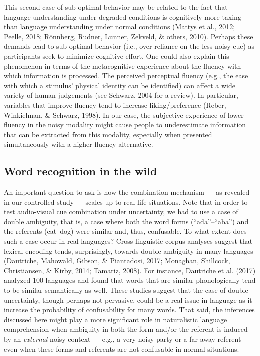 \documentclass[english,,man,floatsintext]{apa6}
\theoremstyle{definition}
\theoremstyle{definition}
\theoremstyle{definition}
\theoremstyle{remark}
\begin{document}
This second case of sub-optimal behavior may be related to the fact that
language understanding under degraded conditions is cognitively more
taxing than language understanding under normal conditions (Mattys et
al., 2012; Peelle, 2018; Rönnberg, Rudner, Lunner, Zekveld, \& others,
2010). Perhaps these demands lead to sub-optimal behavior (i.e.,
over-reliance on the less noisy cue) as participants seek to minimize
cognitive effort. One could also explain this phenomenon in terms of the
metacognitive experience about the fluency with which information is
processed. The perceived perceptual fluency (e.g., the ease with which a
stimulus' physical identity can be identified) can affect a wide variety
of human judgements (see Schwarz, 2004 for a review). In particular,
variables that improve fluency tend to increase liking/preference
(Reber, Winkielman, \& Schwarz, 1998). In our case, the subjective
experience of lower fluency in the noisy modality might cause people to
underestimate information that can be extracted from this modality,
especially when presented simultaneously with a higher fluency
alternative.

\subsection{Word recognition in the
wild}\label{word-recognition-in-the-wild}

An important question to ask is how the combination mechanism --- as
revealed in our controlled study --- scales up to real life situations.
Note that in order to test audio-visual cue combination under
uncertainty, we had to use a case of double ambiguity, that is, a case
where both the word forms (\enquote{ada}--\enquote{aba}) and the
referents (cat--dog) were similar and, thus, confusable. To what extent
does such a case occur in real languages? Cross-linguistic corpus
analyses suggest that lexical encoding tends, surprisingly, towards
double ambiguity in many languages (Dautriche, Mahowald, Gibson, \&
Piantadosi, 2017; Monaghan, Shillcock, Christiansen, \& Kirby, 2014;
Tamariz, 2008). For instance, Dautriche et al. (2017) analyzed 100
languages and found that words that are similar phonologically tend to
be similar semantically as well. These studies suggest that the case of
double uncertainty, though perhaps not pervasive, could be a real issue
in language as it increase the probability of confusability for many
words. That said, the inferences discussed here might play a more
significant role in naturalistic language comprehension when ambiguity
in both the form and/or the referent is induced by an \emph{external}
noisy context --- e.g., a very noisy party or a far away referent ---
even when these forms and referents are not confusable in normal
situations.
\end{document}
